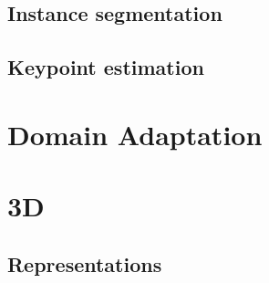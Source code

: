 \documentclass[../main.tex]{subfiles}
\begin{document}
\subsection{Instance segmentation}
\subsection{Keypoint estimation}

\section{Domain Adaptation}

\section{3D}
\subsection{Representations}
\end{document}
